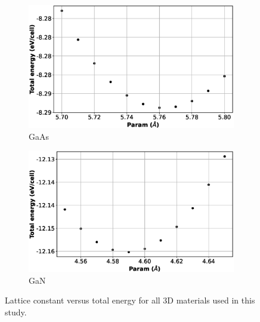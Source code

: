 \begin{figure}[htb]
\begin{subfigure}{0.45\textwidth}
  \includegraphics[width=\linewidth]{images/gaas_3d_opt.eps}
  \caption{GaAs}
\end{subfigure}\hfil %
\begin{subfigure}{0.45\textwidth}
  \includegraphics[width=\linewidth]{images/gan_3d_opt.eps}
  \caption{GaN}
\end{subfigure}

\medskip


\caption{Lattice constant versus total energy for all 3D materials used in this study.}
\label{fig:3d_opt}
\end{figure}

